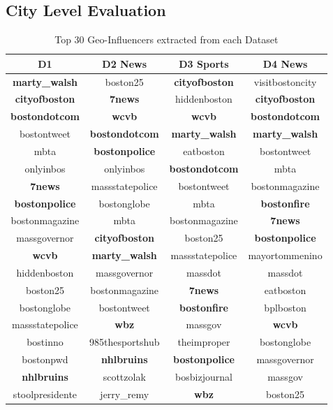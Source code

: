 \subsection{City Level Evaluation}
\begin{table}
\small
\renewcommand{\arraystretch}{1.2}
\caption{Top 30 Geo-Influencers extracted from each Dataset}
\label{table_ch3_3}
\centering
\tabcolsep=0.09cm
\begin{tabular}{|c|c|c|c|}
\hline
\bfseries D1&\bfseries D2 News&\bfseries D3 Sports&\bfseries D4 News\\
\hline
\bfseries marty\_walsh&boston25&\bfseries cityofboston&visitbostoncity\\
\hline
\bfseries cityofboston&\bfseries 7news&hiddenboston&\bfseries cityofboston\\
\hline
\bfseries bostondotcom&\bfseries wcvb&\bfseries wcvb&\bfseries bostondotcom\\
\hline
bostontweet&\bfseries bostondotcom&\bfseries marty\_walsh&\bfseries marty\_walsh\\
\hline
mbta&\bfseries bostonpolice&eatboston&bostontweet\\
\hline
onlyinbos&onlyinbos&\bfseries bostondotcom&mbta\\
\hline
\bfseries 7news&massstatepolice&bostontweet&bostonmagazine\\
\hline
\bfseries bostonpolice&bostonglobe&mbta&\bfseries bostonfire\\
\hline
bostonmagazine&mbta&bostonmagazine&\bfseries 7news\\
\hline
massgovernor&\bfseries cityofboston&boston25&\bfseries bostonpolice\\
\hline
\bfseries wcvb&\bfseries marty\_walsh&massstatepolice&mayortommenino\\
\hline
hiddenboston&massgovernor&massdot&massdot\\
\hline
boston25&bostonmagazine&\bfseries 7news&eatboston\\
\hline
bostonglobe&bostontweet&\bfseries bostonfire&bplboston\\
\hline
massstatepolice&\bfseries wbz&massgov&\bfseries wcvb\\
\hline
bostinno&985thesportshub&theimproper&bostonglobe\\
\hline
bostonpwd&\bfseries nhlbruins&\bfseries bostonpolice&massgovernor\\
\hline
\bfseries nhlbruins&scottzolak&bosbizjournal&massgov\\
\hline
stoolpresidente&jerry\_remy&\bfseries wbz&boston25\\

\end{tabular}
\end{table}
